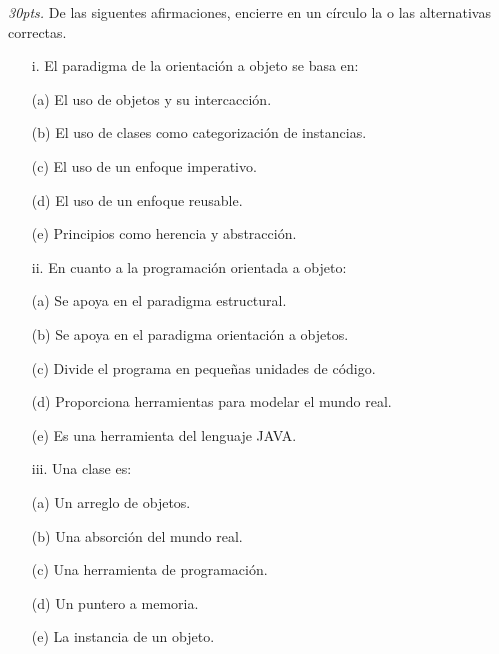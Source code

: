 \documentclass[10pt]{article}
\begin{document}
\begin{enumerate}
   {\scriptsize
    \item \emph{30pts.} De las siguentes afirmaciones, encierre en un c\'irculo la o las alternativas correctas.
 
    \begin{multicols}{2}

    \begin{enumerate}[label=(\alph*)]
        \item[i.] El paradigma de la orientaci\'on a objeto se basa en:
        \item[(a)] El uso de objetos y su intercacci\'on.
        \item[(b)] El uso de clases como categorizaci\'on de instancias.
        \item[(c)] El uso de un enfoque imperativo.
        \item[(d)] El uso de un enfoque reusable.
        \item[(e)] Principios como herencia y abstracci\'on.
    \end{enumerate}

    \begin{enumerate}[label=(\alph*)]
        \item[ii.] En cuanto a la programaci\'on orientada a objeto:
        \item[(a)] Se apoya en el paradigma estructural.
        \item[(b)] Se apoya en el paradigma orientaci\'on a objetos.
        \item[(c)] Divide el programa en peque\~nas unidades de c\'odigo.
        \item[(d)] Proporciona herramientas para modelar el mundo real.
        \item[(e)] Es una herramienta del lenguaje JAVA.
    \end{enumerate}

    \begin{enumerate}[label=(\alph*)]
        \item[iii.] Una clase es: 
        \item[(a)] Un arreglo de objetos.
        \item[(b)] Una absorci\'on del mundo real.
        \item[(c)] Una herramienta de programaci\'on.
        \item[(d)] Un puntero a memoria.
        \item[(e)] La instancia de un objeto.
    \end{enumerate}


\end{multicols}}
\end{enumerate}
\end{document}
